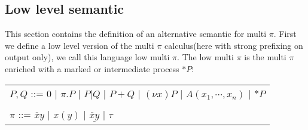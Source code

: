 \subsection{Low level semantic}
This section contains the definition of an alternative semantic for multi $\pi$. First we define a low level version of the multi $\pi$ calculus(here with strong prefixing on output only), we call this language low multi $\pi$. The low multi $\pi$ is the multi $\pi$ enriched with a marked or intermediate process $*P$:
\begin{center}
   \begin{tabular}{l}
     $P,Q$ ::= $0$ | $\pi.P$ | $P|Q$ | $P+Q$ | $(\nu x) P$ | $A(x_{1}, \cdots, x_{n})$ | $*P$
   \\\\
     $\pi$ ::= $\overline{x}y$ | $x(y)$ | $\underline{\overline{x}y}$ | $\tau$ 
   \end{tabular}
\end{center}
